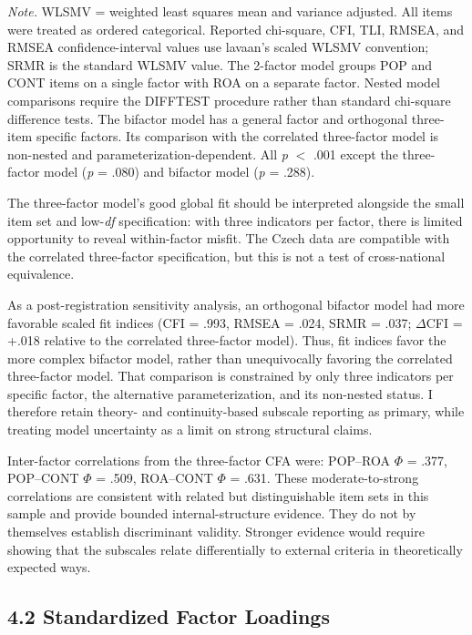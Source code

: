 \documentclass[PCJ,Unicode,screen,mode=plain]{cedram}
\begin{document}
\emph{Note.} WLSMV = weighted least squares mean and variance adjusted. All
items were treated as ordered categorical. Reported chi-square, CFI, TLI,
RMSEA, and RMSEA confidence-interval values use lavaan's scaled WLSMV
convention; SRMR is the standard WLSMV value. The 2-factor model groups POP and
CONT items on a single factor with ROA on a separate factor. Nested model
comparisons require the DIFFTEST procedure rather than standard chi-square
difference tests. The bifactor model has a general factor and orthogonal
three-item specific factors. Its comparison with the correlated three-factor
model is non-nested and parameterization-dependent. All \emph{p} $<$ .001
except the three-factor model (\emph{p} = .080) and bifactor model
(\emph{p} = .288).

The three-factor model's good global fit should be interpreted alongside the
small item set and low-\emph{df} specification: with three indicators per
factor, there is limited opportunity to reveal within-factor misfit. The Czech
data are compatible with the correlated three-factor specification, but this is
not a test of cross-national equivalence.

As a post-registration sensitivity analysis, an orthogonal bifactor model had
more favorable scaled fit indices (CFI = .993, RMSEA = .024, SRMR = .037;
$\Delta$CFI = +.018 relative to the correlated three-factor model). Thus, fit
indices favor the more complex bifactor model, rather than unequivocally
favoring the correlated three-factor model. That comparison is constrained by
only three indicators per specific factor, the alternative parameterization,
and its non-nested status. I therefore retain theory- and continuity-based
subscale reporting as primary, while treating model uncertainty as a limit on
strong structural claims.

Inter-factor correlations from the three-factor CFA were: POP--ROA \(\Phi\) = .377, POP--CONT \(\Phi\) = .509, ROA--CONT \(\Phi\) = .631. These moderate-to-strong correlations are consistent with related but distinguishable item sets in this sample and provide bounded internal-structure evidence. They do not by themselves establish discriminant validity. Stronger evidence would require showing that the subscales relate differentially to external criteria in theoretically expected ways.

\subsection*{4.2 Standardized Factor Loadings}\label{standardized-factor-loadings}
\end{document}
